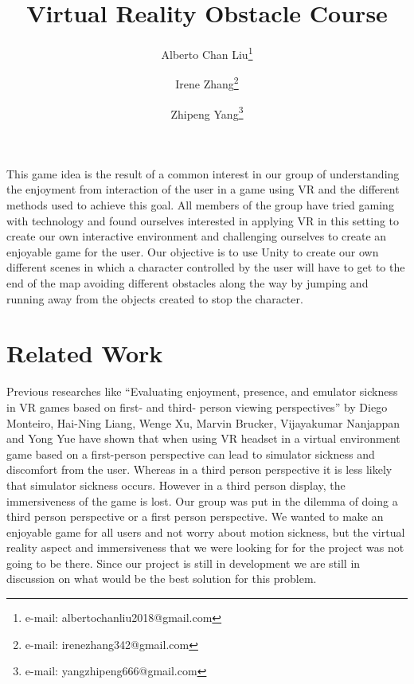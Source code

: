 \documentclass{vgtc}                          %
\title{Virtual Reality Obstacle Course}
\author{Alberto Chan Liu\thanks{e-mail: albertochanliu2018@gmail.com}\\ %
\and Irene Zhang\thanks{e-mail: irenezhang342@gmail.com}\\ %
\and Zhipeng Yang\thanks{e-mail: yangzhipeng666@gmail.com}\\ %
     }
\begin{document}


\maketitle

This game idea is the result of a common interest in our group of understanding the enjoyment from interaction of the user in a game using VR and the different methods used to achieve this goal. All members of the group have tried gaming with technology and found ourselves interested in applying VR in this setting to create our own interactive environment and challenging ourselves to create an enjoyable game for the user. 							
Our objective is to use Unity to create our own different scenes in which a character controlled by the user will have to get to the end of the map avoiding different obstacles along the way by jumping and running away from the objects created to stop the character.


\section{Related Work}

Previous researches like “Evaluating enjoyment, presence, and emulator sickness in VR games based on first- and third- person viewing perspectives”  by Diego Monteiro, Hai-Ning Liang, Wenge Xu, Marvin Brucker, Vijayakumar Nanjappan and Yong Yue
 have shown that when using VR headset in a virtual environment game based on a first-person perspective can lead to simulator sickness and discomfort from the user. Whereas in a third person perspective it is less likely that simulator sickness occurs. However in a third person display, the immersiveness of the game is lost.
Our group was put in the dilemma of doing a third person perspective or a first person perspective. We wanted to make an enjoyable game for all users and not worry about motion sickness, but the virtual reality aspect and immersiveness that we were looking for for the project was not going to be there. Since our project is still in development we are still in discussion on what would be the best solution for this problem.
\end{document}
